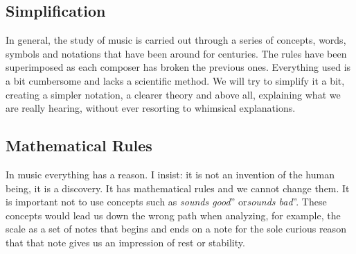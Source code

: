 \documentclass[]{report}
\begin{document}
\subsection{Simplification}
In general, the study of music is carried out through a series of concepts, words, symbols and notations that have been around for centuries. The rules have been superimposed as each composer has broken the previous ones. Everything used is a bit cumbersome and lacks a scientific method. We will try to simplify it a bit, creating a simpler notation, a clearer theory and above all, explaining what we are really hearing, without ever resorting to whimsical explanations.
\subsection{Mathematical Rules}
In music everything has a reason. I insist: it is not an invention of the human being, it is a discovery. It has mathematical rules and we cannot change them.
It is important not to use concepts such as \emph{sounds good}'' or\emph{sounds bad}''. These concepts would lead us down the wrong path when analyzing, for example, the scale as a set of notes that begins and ends on a note for the sole curious reason that that note gives us an impression of rest or stability.
\end{document}
